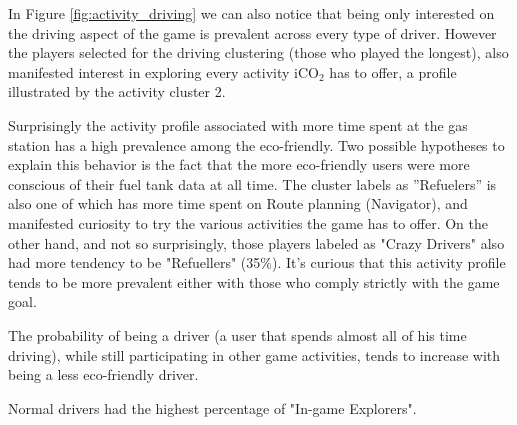 \documentclass[preprint,authoryear,12pt]{elsarticle}
\begin{document}
In Figure \ref{fig:activity_driving} we can also notice that being only interested on the driving aspect of the game is prevalent across every type of driver. However the players selected for the driving clustering (those who played the longest), also manifested interest in exploring every activity iCO$_2$ has to offer, a profile illustrated by the activity cluster 2.

Surprisingly the activity profile associated with more time spent at the gas station has a high prevalence among the eco-friendly. Two possible hypotheses to explain this behavior is the fact that the more eco-friendly users were more conscious of their fuel tank data at all time. The cluster labels as ''Refuelers'' is also one of which has more time spent on Route planning (Navigator), and manifested curiosity to try the various activities the game has to offer. On the other hand, and not so surprisingly, those players labeled as "Crazy Drivers" also had more tendency to be "Refuellers" (35\%). It's curious that this activity profile tends to be more prevalent either with those who comply strictly with the game goal. 

The probability of being a driver (a user that spends almost all of his time driving), while still participating in other game activities, tends to increase with being a less eco-friendly driver.

Normal drivers had the highest percentage of "In-game Explorers".


\end{document}
